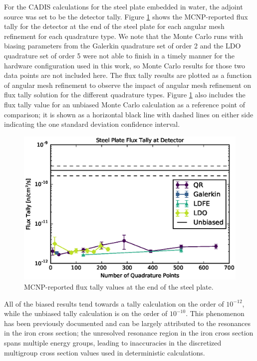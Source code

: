 \documentclass{article} %
\begin{document}
For the CADIS calculations for the steel plate embedded in water, the adjoint
source was set to be the detector tally. Figure \ref{steel-cad-tally} shows
the MCNP-reported flux tally for the detector at the end of the steel plate
for each angular mesh refinement for each quadrature type. We note that the
Monte Carlo runs with biasing parameters from the Galerkin quadrature set of
order 2 and the LDO quadrature set of order 5 were not able to finish in a
timely manner for the hardware configuration used in this work, so Monte Carlo
results for those two data points are not included here. The flux tally
results are plotted as a function of angular mesh refinement to observe the
impact of angular mesh refinement on flux tally solution for the different
quadrature types. Figure \ref{steel-cad-tally} also includes the flux tally
value for an unbiased Monte Carlo calculation as a reference point of
comparison; it is shown as a horizontal black line with dashed lines on either
side indicating the one standard deviation confidence interval.

\begin{figure}[!hbt]
\centering
\includegraphics[max height=0.445\textheight]{img/steel-cadis-tally.eps}
\caption{MCNP-reported flux tally values at the end of the steel plate.}
\label{steel-cad-tally}
\end{figure}

All of the biased results tend towards a tally calculation on the order of
$10^{-12}$, while the unbiased tally calculation is on the order of
$10^{-10}$. This phenomenon has been previously documented
\cite{wilsonslaybaugh} and can be largely attributed to the resonances in the
iron cross section; the unresolved resonance region in the iron cross section
spans multiple energy groups, leading to inaccuracies in the discretized
multigroup cross section values used in deterministic calculations.
\end{document}
